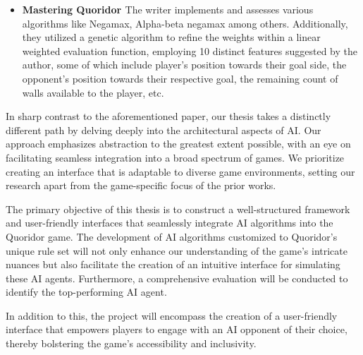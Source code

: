 \begin{itemize}
    \item \textbf{Mastering Quoridor \citep{Glendenning2002MasteringQ}}
    The writer implements and assesses various algorithms like Negamax, Alpha-beta negamax among others.
    Additionally, they utilized a genetic algorithm to refine the weights within a linear weighted evaluation
    function, employing 10 distinct features suggested by the author, some of which include player's position
    towards their goal side, the opponent's position towards their respective goal, the remaining count of
    walls available to the player, etc.
\end{itemize}


In sharp contrast to the aforementioned paper, our thesis takes a distinctly different path by delving deeply
into the architectural aspects of AI. Our approach emphasizes abstraction to the greatest extent possible, with
an eye on facilitating seamless integration into a broad spectrum of games. We prioritize creating an
interface that is adaptable to diverse game environments, setting our research apart from the game-specific
focus of the prior works.






The primary objective of this thesis is to construct a well-structured framework and user-friendly interfaces
that seamlessly integrate AI algorithms into the Quoridor game. The development of AI algorithms customized to
Quoridor's unique rule set will not only enhance our understanding of the game's intricate nuances but also
facilitate the creation of an intuitive interface for simulating these AI agents. Furthermore, a comprehensive
evaluation will be conducted to identify the top-performing AI agent.

In addition to this, the project will encompass the creation of a user-friendly interface that empowers players
to engage with an AI opponent of their choice, thereby bolstering the game's accessibility and inclusivity.



